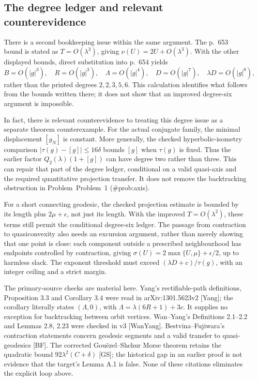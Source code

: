 \documentclass[10pt]{article}
\begin{document}
\subsection*{The degree ledger and relevant counterevidence}
There is a second bookkeeping issue within the same argument. The p. 653 bound is stated as \(T=O(\lambda^3)\), giving \(\nu(U)=2U+O(\lambda^3)\). With the other displayed bounds, direct substitution into p. 654 yields \[B=O(|g|^3),\quad R=O(|g|^3),\quad
 \Lambda=O(|g|^4),\quad D=O(|g|^7),\quad
 \lambda D=O(|g|^8),\] rather than the printed degrees \(2,2,3,5,6\). This calculation identifies what follows from the bounds written there; it does not show that an improved degree-six argument is impossible.\par
In fact, there is relevant counterevidence to treating this degree issue as a separate theorem counterexample. For the actual conjugate family, the minimal displacement \([g_N]\) is constant. More generally, the checked hyperbolic-isometry comparison \(\lvert\tau(g)-[g]\rvert\le16\delta\) bounds \([g]\) when \(\tau(g)\) is fixed. Thus the earlier factor \(Q_2(\lambda)(1+[g])\) can have degree two rather than three. This can repair that part of the degree ledger, conditional on a valid quasi-axis and the required quantitative projection transfer. It does not remove the backtracking obstruction in Problem Problem 1 (\#prob:axis).\par
For a short connecting geodesic, the checked projection estimate is bounded by its length plus \(2\mu+\epsilon\), not just its length. With the improved \(T=O(\lambda^2)\), these terms still permit the conditional degree-six ledger. The passage from contraction to quasiconvexity also needs an excursion argument, rather than merely showing that one point is close: each component outside a prescribed neighbourhood has endpoints controlled by contraction, giving \(\sigma(U)=2\max\{U,\mu\}+\epsilon/2\), up to harmless slack. The exponent threshold must exceed \((\lambda D+c)/\tau(g)\), with an integer ceiling and a strict margin.\par
The primary-source checks are material here. Yang’s rectifiable-path definitions, Proposition 3.3 and Corollary 3.4 were read in arXiv:1301.5623v2 [Yang]; the corollary literally states \((\Lambda,0)\), with \(\Lambda=\lambda(6R+1)+3c\). It supplies no exception for backtracking between orbit vertices. Wan–Yang’s Definitions 2.1–2.2 and Lemmas 2.8, 2.23 were checked in v3 [WanYang]. Bestvina–Fujiwara’s contraction statements concern geodesic segments and a valid transfer to quasi-geodesics [BF]. The corrected Gouëzel–Shchur Morse theorem retains the quadratic bound \(92\lambda^2(C+\delta)\) [GS]; the historical gap in an earlier proof is not evidence that the target’s Lemma A.1 is false. None of these citations eliminates the explicit loop above.\par
\end{document}
